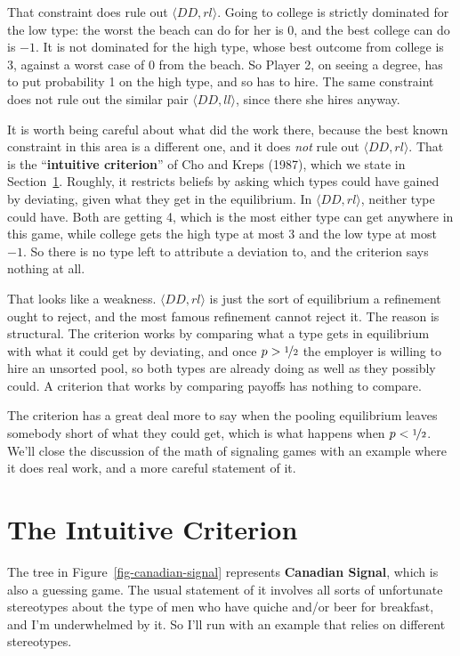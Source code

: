\documentclass[
  11pt,
  letterpaper,
]{scrbook}
\begin{document}
That constraint does rule out \(\langle DD, rl \rangle\). Going to
college is strictly dominated for the low type: the worst the beach can
do for her is 0, and the best college can do is \(-1\). It is not
dominated for the high type, whose best outcome from college is 3,
against a worst case of 0 from the beach. So Player 2, on seeing a
degree, has to put probability 1 on the high type, and so has to hire.
The same constraint does not rule out the similar pair
\(\langle DD, ll \rangle\), since there she hires anyway.

It is worth being careful about what did the work there, because the
best known constraint in this area is a different one, and it does
\emph{not} rule out \(\langle DD, rl \rangle\). That is the
``\textbf{intuitive criterion}'' of Cho and Kreps (1987), which we state
in Section~\ref{sec-intuitive-criterion}. Roughly, it restricts beliefs
by asking which types could have gained by deviating, given what they
get in the equilibrium. In \(\langle DD, rl \rangle\), neither type
could have. Both are getting 4, which is the most either type can get
anywhere in this game, while college gets the high type at most 3 and
the low type at most \(-1\). So there is no type left to attribute a
deviation to, and the criterion says nothing at all.

That looks like a weakness. \(\langle DD, rl \rangle\) is just the sort
of equilibrium a refinement ought to reject, and the most famous
refinement cannot reject it. The reason is structural. The criterion
works by comparing what a type gets in equilibrium with what it could
get by deviating, and once \(p > \nicefrac{1}{2}\) the employer is
willing to hire an unsorted pool, so both types are already doing as
well as they possibly could. A criterion that works by comparing payoffs
has nothing to compare.

The criterion has a great deal more to say when the pooling equilibrium
leaves somebody short of what they could get, which is what happens when
\(p < \nicefrac{1}{2}\). We'll close the discussion of the math of
signaling games with an example where it does real work, and a more
careful statement of it.

\section{The Intuitive Criterion}\label{sec-intuitive-criterion}

The tree in Figure~\ref{fig-canadian-signal} represents \textbf{Canadian
Signal}, which is also a guessing game. The usual statement of it
involves all sorts of unfortunate stereotypes about the type of men who
have quiche and/or beer for breakfast, and I'm underwhelmed by it. So
I'll run with an example that relies on different stereotypes.
\end{document}

